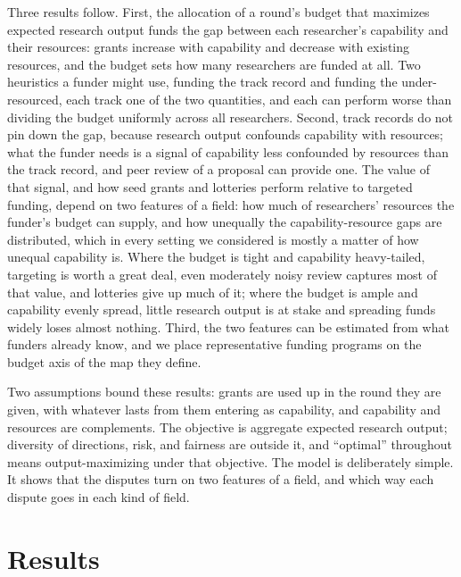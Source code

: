\documentclass[9pt,twocolumn,twoside]{pnas-new}
\begin{document}
Three results follow. First, the allocation of a round's budget that maximizes expected research output funds the gap between each researcher's capability and their resources: grants increase with capability and decrease with existing resources, and the budget sets how many researchers are funded at all. Two heuristics a funder might use, funding the track record and funding the under-resourced, each track one of the two quantities, and each can perform worse than dividing the budget uniformly across all researchers. Second, track records do not pin down the gap, because research output confounds capability with resources; what the funder needs is a signal of capability less confounded by resources than the track record, and peer review of a proposal can provide one. The value of that signal, and how seed grants and lotteries perform relative to targeted funding, depend on two features of a field: how much of researchers' resources the funder's budget can supply, and how unequally the capability-resource gaps are distributed, which in every setting we considered is mostly a matter of how unequal capability is. Where the budget is tight and capability heavy-tailed, targeting is worth a great deal, even moderately noisy review captures most of that value, and lotteries give up much of it; where the budget is ample and capability evenly spread, little research output is at stake and spreading funds widely loses almost nothing. Third, the two features can be estimated from what funders already know, and we place representative funding programs on the budget axis of the map they define.

Two assumptions bound these results: grants are used up in the round they are given, with whatever lasts from them entering as capability, and capability and resources are complements. The objective is aggregate expected research output; diversity of directions, risk, and fairness are outside it, and ``optimal'' throughout means output-maximizing under that objective. The model is deliberately simple. It shows that the disputes turn on two features of a field, and which way each dispute goes in each kind of field.

\section*{Results}
\end{document}
